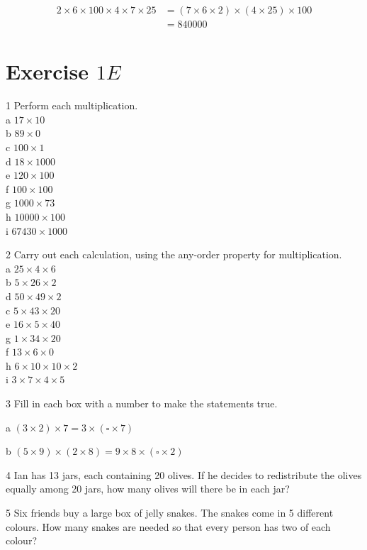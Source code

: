 \documentclass[10pt]{article}
\begin{document}
\[
\begin{aligned}
2 \times 6 \times 100 \times 4 \times 7 \times 25 & =(7 \times 6 \times 2) \times(4 \times 25) \times 100 \\
& =840000
\end{aligned}
\]

\section*{Exercise \(1 E\)}
1 Perform each multiplication.\\
a \(17 \times 10\)\\
b \(89 \times 0\)\\
c \(100 \times 1\)\\
d \(18 \times 1000\)\\
e \(120 \times 100\)\\
f \(100 \times 100\)\\
g \(1000 \times 73\)\\
h \(10000 \times 100\)\\
i \(67430 \times 1000\)

2 Carry out each calculation, using the any-order property for multiplication.\\
a \(25 \times 4 \times 6\)\\
b \(5 \times 26 \times 2\)\\
d \(50 \times 49 \times 2\)\\
c \(5 \times 43 \times 20\)\\
e \(16 \times 5 \times 40\)\\
g \(1 \times 34 \times 20\)\\
f \(13 \times 6 \times 0\)\\
h \(6 \times 10 \times 10 \times 2\)\\
i \(3 \times 7 \times 4 \times 5\)

3 Fill in each box with a number to make the statements true.

a \((3 \times 2) \times 7=3 \times(\square \times 7)\)

b \((5 \times 9) \times(2 \times 8)=9 \times 8 \times(\square \times 2)\)

4 Ian has 13 jars, each containing 20 olives. If he decides to redistribute the olives equally among 20 jars, how many olives will there be in each jar?

5 Six friends buy a large box of jelly snakes. The snakes come in 5 different colours. How many snakes are needed so that every person has two of each colour?
\end{document}
